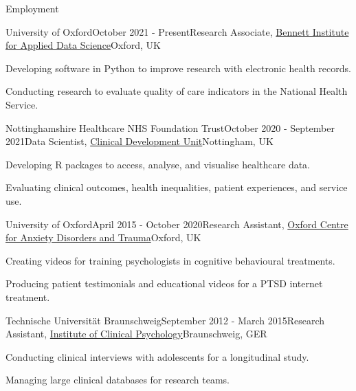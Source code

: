 \documentclass{resume} %
\begin{document}

\begin{rSection}{Employment}

\begin{rSubsection}{University of Oxford}{October 2021 - Present}{Research Associate, \href{https://www.bennett.ox.ac.uk/}{Bennett Institute for Applied Data Science}}{Oxford, UK}
  \item Developing software in Python to improve research with electronic health records.
  \item Conducting research to evaluate quality of care indicators in the National Health Service.
\end{rSubsection}

\begin{rSubsection}{Nottinghamshire Healthcare NHS Foundation Trust}{October 2020 - September 2021}{Data Scientist, \href{https://www.nottinghamshirehealthcare.nhs.uk/}{Clinical Development Unit}}{Nottingham, UK}
  \item Developing R packages to access, analyse, and visualise healthcare data.
  \item Evaluating clinical outcomes, health inequalities, patient experiences, and service use.
\end{rSubsection}

\begin{rSubsection}{University of Oxford}{April 2015 - October 2020}{Research Assistant, \href{https://www.psy.ox.ac.uk/research/oxford-centre-for-anxiety-disorders-and-trauma}{Oxford Centre for Anxiety Disorders and Trauma}}{Oxford, UK}
  \item Creating videos for training psychologists in cognitive behavioural treatments.
  \item Producing patient testimonials and educational videos for a PTSD internet treatment.
\end{rSubsection}

\begin{rSubsection}{Technische Universit{\"a}t Braunschweig}{September 2012 - March 2015}{Research Assistant, \href{https://www.tu-braunschweig.de/psychologie/klinische}{Institute of Clinical Psychology}}{Braunschweig, GER}
  \item Conducting clinical interviews with adolescents for a longitudinal study.
  \item Managing large clinical databases for research teams.
\end{rSubsection}

\end{rSection}
\end{document}
